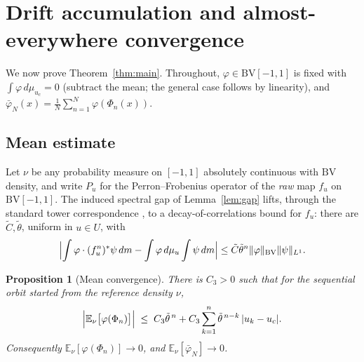 \documentclass[11pt,a4paper]{article}
\newtheorem{proposition}[theorem]{Proposition}
\theoremstyle{definition}
\begin{document}
\section{Drift accumulation and almost-everywhere convergence}
\label{sec:birkhoff}

We now prove Theorem~\ref{thm:main}. Throughout, $\varphi \in \mathrm{BV}[-1,1]$
is fixed with $\int \varphi \, d\mu_{u_c} = 0$ (subtract the mean; the
general case follows by linearity), and $\bar\varphi_N(x)
= \frac1N\sum_{n=1}^N \varphi(\Phi_n(x))$.

\subsection{Mean estimate}

Let $\nu$ be any probability measure on $[-1,1]$ absolutely continuous
with $\mathrm{BV}$ density, and write $P_u$ for the Perron--Frobenius
operator of the \emph{raw} map $f_u$ on $\mathrm{BV}[-1,1]$. The induced
spectral gap of Lemma~\ref{lem:gap} lifts, through the standard tower
correspondence \cite{young1992decay}, to a decay-of-correlations bound
for $f_u$: there are $\tilde C, \tilde\theta$, uniform in $u \in U$,
with
\begin{equation}
\label{eq:doc}
  \Bigl| \int \varphi \cdot (f_u^n)^* \psi \, dm
        - \int \varphi \, d\mu_u \int \psi \, dm \Bigr|
  \leq \tilde C \tilde\theta^{n} \|\varphi\|_{\mathrm{BV}} \|\psi\|_{L^1}.
\end{equation}

\begin{proposition}[Mean convergence]
\label{prop:mean}
There is $C_3 > 0$ such that for the sequential orbit started from the
reference density $\nu$,
\[
  \Bigl| \mathbb{E}_\nu\bigl[\varphi(\Phi_n)\bigr] \Bigr|
  \;\leq\; C_3 \tilde\theta^{\,n}
         + C_3 \sum_{k=1}^{n} \tilde\theta^{\,n-k}\,|u_k - u_c|.
\]
Consequently $\mathbb{E}_\nu[\varphi(\Phi_n)] \to 0$, and
$\mathbb{E}_\nu[\bar\varphi_N] \to 0$.
\end{proposition}
\end{document}

